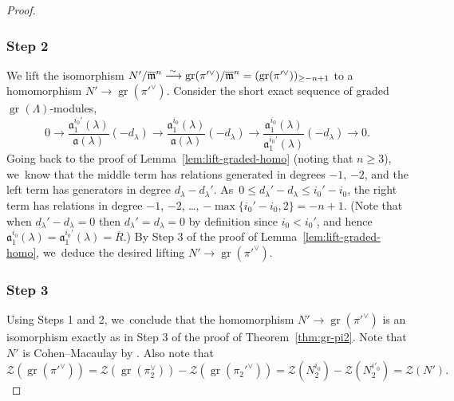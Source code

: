 \documentclass[JEP,XML,SOM,Unicode,NoFloatCountersInSection, NoEqCountersInSection,published]{cedram}
\let\ovl\overline
\newcommand{\cZ}{\mathcal{Z}}
\newcommand{\fa}{\mathfrak{a}}
\DeclareMathOperator{\gr}{gr}
\theoremstyle{plain}
\theoremstyle{definition}
\begin{document}
\begin{proof}
\subsubsection*{Step 2}
We lift the isomorphism $ N'/\ovl\m^n \congto \gr(\pi'^\vee)/\ovl\m^n =(\gr(\pi'^\vee))_{\ge -n+1}$ to a homomorphism $N' \to \gr(\pi'^\vee)$.
Consider the short exact sequence of graded $\gr(\Lambda)$-modules,
\begin{equation*}
0 \to \frac{\fa_1^{i_0'}(\lambda)}{\fa(\lambda)}(-d_\lambda) \to \frac{\fa_1^{i_0}(\lambda)}{\fa(\lambda)}(-d_\lambda) \to \frac{\fa_1^{i_0}(\lambda)}{\fa_1^{i_0'}(\lambda)}(-d_\lambda) \to 0.
\end{equation*}
Going back to the proof of Lemma~\ref{lem:lift-graded-homo} (noting that $n \ge 3$), we~know that the middle term has relations generated in degrees $-1$, $-2$, and the left term has generators in degree $d_\lambda-d_\lambda'$. As~$0 \le d_\lambda'-d_\lambda \le i_0'-i_0$, the right term has relations in degree $-1$, $-2$, \dots, $-\max\{i_0'-i_0,2\}=-n+1$.
(Note that when $d_\lambda'-d_\lambda=0$ then $d_\lambda' = d_\lambda = 0$ by definition since $i_0 < i_0'$, and hence $\fa_1^{i_0}(\lambda) = \fa_1^{i_0'}(\lambda) = \ovl R$.)
By Step 3 of the proof of Lemma~\ref{lem:lift-graded-homo}, we~deduce the desired lifting $N' \to \gr(\pi'^\vee)$.

\subsubsection*{Step 3}
Using Steps 1 and 2, we~conclude that the homomorphism $N' \to \gr(\pi'^\vee)$ is an isomorphism exactly as in Step 3 of the proof of Theorem~\ref{thm:gr-pi2}.
Note that $N'$ is Cohen--Macaulay by \cite[Cor.\,4.4.6]{BHHMS4}.
Also note that
\[
\cZ(\gr(\pi'^\vee)) = \cZ(\gr(\pi_2^\vee)) - \cZ(\gr(\pi_2'^\vee)) = \cZ(N_2^{i_0})-\cZ(N_2^{i'_0}) = \cZ(N').
\]


\end{proof}
\end{document}
